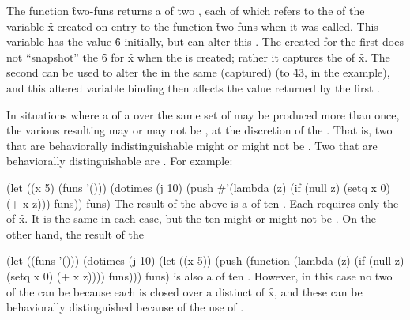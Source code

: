The function \f{two-funs} returns a  of two 
, each of which refers to the  of the
variable \f{x} created on entry to the function \f{two-funs} when it
was called.
This variable has the value \f{6}
initially, but  can alter this .
The  created for the first 
 does not ``snapshot'' the  \f{6} for \f{x}
when the  is created; rather it captures the  of \f{x}.
The second  can be used to alter the  in the same (captured)
 (to \f{43}, in the example), and
this altered variable binding then affects the value returned by the first .

                     
In situations where a  of a 
 over the same set of  may be
produced more than once, the various resulting  may
or may not be , at the discretion of the .
That is, two  that are behaviorally
indistinguishable might or might not be .
Two  that are behaviorally distinguishable are .
For example:
 
\code
 (let ((x 5) (funs '()))
   (dotimes (j 10)                          
     (push #'(lambda (z)                        
               (if (null z) (setq x 0) (+ x z)))
           funs))
   funs)
\endcode
The result of the above  is a  of ten .
Each requires only the  of \f{x}.
It is the same  in each case, 
but the ten   might or might not be .
On the other hand, the result of the 
 
\code
 (let ((funs '()))     
   (dotimes (j 10)
     (let ((x 5))
       (push (function (lambda (z)
                        (if (null z) (setq x 0) (+ x z))))
             funs)))
  funs)
\endcode
is also a  of ten .
However, in this case no two of the   can
be  because each  is closed over a distinct
 of \f{x}, and these  can be behaviorally
distinguished because of the use of .
 
